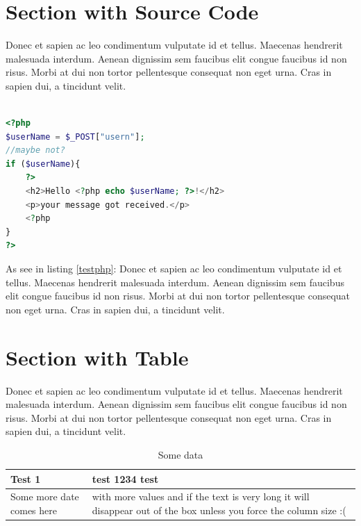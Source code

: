 \documentclass[11pt,a4paper,oneside,article]{memoir}
\begin{document}
\section{Section with Source Code}
Donec et sapien ac leo condimentum vulputate id et tellus. Maecenas hendrerit malesuada interdum. Aenean dignissim sem faucibus elit congue faucibus id non risus. Morbi at dui non tortor pellentesque consequat non eget urna. Cras in sapien dui, a tincidunt velit.

\vspace{-22pt}\begin{lstlisting}[language=PHP,caption={Descriptive Caption Text},label=testphp] 

<?php
$userName = $_POST["usern"];
//maybe not?
if ($userName){
	?>
	<h2>Hello <?php echo $userName; ?>!</h2>
	<p>your message got received.</p>
	<?php
}
?>
\end{lstlisting}\vspace{-22pt}


As see in listing \ref{testphp}: Donec et sapien ac leo condimentum vulputate id et tellus. Maecenas hendrerit malesuada interdum. Aenean dignissim sem faucibus elit congue faucibus id non risus. Morbi at dui non tortor pellentesque consequat non eget urna. Cras in sapien dui, a tincidunt velit.

\section{Section with Table}
Donec et sapien ac leo condimentum vulputate id et tellus. Maecenas hendrerit malesuada interdum. Aenean dignissim sem faucibus elit congue faucibus id non risus. Morbi at dui non tortor pellentesque consequat non eget urna. Cras in sapien dui, a tincidunt velit.

\begin{table}[h]
  \centering
  \caption{Some data}
  \begin{tabular}{| l | >{\centering\arraybackslash}p{} |}
    \hline
    Test 1 & test 1234 test \\
    \hline
    Some more date comes here & with more values and if the text is very long it will disappear out of the box unless you force the column size :( \\
    \hline
  \end{tabular}
  \label{table:some_data}
\end{table}
\end{document}

